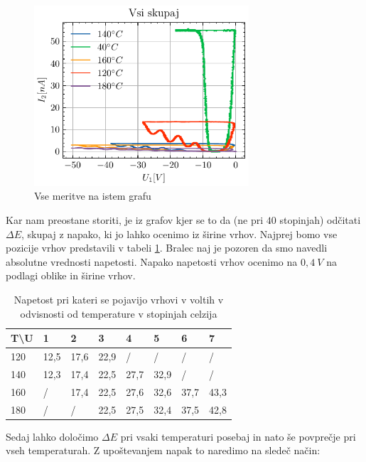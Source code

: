 \documentclass[10pt]{article}
\begin{document}
\begin{figure}[h]
    \begin{center}
        \includegraphics[width=8cm]{vsi.pdf}
        \caption{Vse meritve na istem grafu}
        \label{vsi}
    \end{center}
\end{figure}


Kar nam preostane storiti, je iz grafov kjer se to da (ne pri $40$ stopinjah) odčitati $\Delta E$, skupaj z napako, ki jo lahko ocenimo iz širine vrhov. Najprej bomo vse pozicije vrhov predstavili v tabeli \ref{vrhovi}. Bralec naj je pozoren da smo navedli absolutne vrednosti napetosti. Napako napetosti vrhov ocenimo na $0,4\ V$ na podlagi oblike in širine vrhov.

\newpage

\begin{table}[ht]
    \begin{center}
    \begin{tabular}{l|lllllll}
    T\textbackslash{}U & 1    & 2    & 3    & 4    & 5    & 6    & 7    \\ \hline
    120                & 12,5 & 17,6 & 22,9 & /    & /    & /    & /    \\
    140                & 12,3 & 17,4 & 22,5 & 27,7 & 32,9 & /    & /    \\
    160                & /    & 17,4 & 22,5 & 27,6 & 32,6 & 37,7 & 43,3 \\
    180                & /    & /    & 22,5 & 27,5 & 32,4 & 37,5 & 42,8
    \end{tabular}
    \caption{Napetost pri kateri se pojavijo vrhovi v voltih v odvisnosti od temperature v stopinjah celzija}
    \label{vrhovi}
    \end{center}
\end{table}



Sedaj lahko določimo $\Delta E$ pri vsaki temperaturi posebaj in nato še povprečje pri vseh temperaturah. Z upoštevanjem napak to naredimo na sledeč način:
\end{document}
